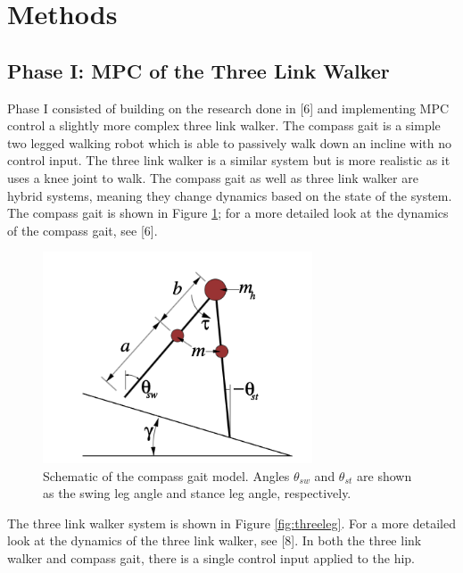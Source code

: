 \documentclass{./springer/svjour3}
\begin{document}
\section{Methods}

\subsection{Phase I: MPC of the Three Link Walker}

Phase I consisted of building on the research done in [6] and implementing MPC control a slightly more complex three link walker.
The compass gait is a simple two legged walking robot which is able to passively walk down an incline with no control input. The three link walker is a similar system 
but is more realistic as it uses a knee joint to walk. The compass gait as well as three link walker are hybrid systems, meaning they change dynamics based on the state of the system.
The compass gait is shown in Figure \ref{fig:compass_gait}; for a more detailed look at the dynamics of the compass gait, see [6].

\begin{figure}[!h]
  \centering
  \includegraphics[width=8cm]{./figures/compassgaitmodel.png}
  \caption{Schematic of the compass gait model. Angles $\theta_{sw}$ and $\theta_{st}$ are shown as the swing leg angle and stance leg angle, respectively.}
  \label{fig:compass_gait}
\end{figure}

The three link walker system is shown in Figure \ref{fig:threeleg}. For a more detailed look at the dynamics of the three link walker, see [8]. In both the three link walker and
compass gait, there is a single control input applied to the hip.
\end{document}
